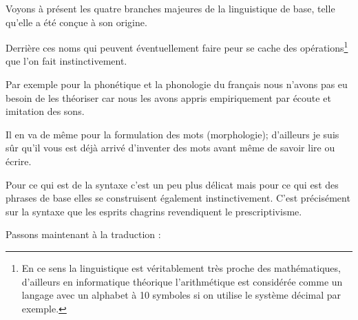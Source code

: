 Voyons à présent les quatre branches majeures de la linguistique de
base, telle qu'elle a été conçue à son origine.

\begin{center}
\begin{mdframed}[style=citestyle, frametitle={Extrait du livre \bs}]
\end{mdframed}  
\end{center}

Derrière ces noms qui peuvent éventuellement faire peur se cache des
opérations\footnote{En ce sens la linguistique est véritablement très
  proche des mathématiques, d'ailleurs en informatique théorique
  l'arithmétique est considérée comme un langage avec un alphabet à 10
symboles si on utilise le système décimal par exemple.} que l'on fait
instinctivement.

Par exemple pour la phonétique et la phonologie du français nous
n'avons pas eu besoin de les théoriser car nous les avons appris
empiriquement par écoute et imitation des sons.

Il en va de même pour la formulation des mots (morphologie); d'ailleurs je suis sûr
qu'il vous est déjà arrivé d'inventer des mots avant même de savoir
lire ou écrire.

Pour ce qui est de la syntaxe c'est un peu plus délicat mais pour ce
qui est des phrases de base elles se construisent également
instinctivement. C'est précisément sur la syntaxe que les esprits
chagrins revendiquent le prescriptivisme.


Passons maintenant à la traduction :

